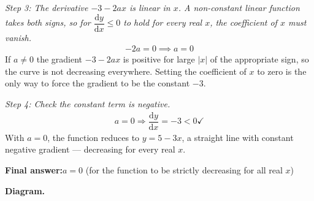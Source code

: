 \documentclass[11pt]{article}
\begin{document}
\textit{Step 3: The derivative \( -3 - 2ax \) is linear in \( x \). A non-constant linear function takes both signs, so for \( \dfrac{\mathrm{d}y}{\mathrm{d}x} \leq 0 \) to hold for every real \( x \), the coefficient of \( x \) must vanish.}
\[\begin{gathered}
-2a = 0 \implies a = 0
\end{gathered}\]
If \( a \neq 0 \) the gradient \( -3 - 2ax \) is positive for large \( |x| \) of the appropriate sign, so the curve is not decreasing everywhere. Setting the coefficient of \( x \) to zero is the only way to force the gradient to be the constant \(-3\).

\textit{Step 4: Check the constant term is negative.}
\[\begin{gathered}
a = 0 \Rightarrow \dfrac{\mathrm{d}y}{\mathrm{d}x} = -3 < 0 \checkmark
\end{gathered}\]
With \( a = 0 \), the function reduces to \( y = 5 - 3x \), a straight line with constant negative gradient --- decreasing for every real \( x \).

\begin{answerbox}
\textbf{Final answer:}\quad \(\displaystyle  a = 0 \) (for the function to be strictly decreasing for all real \(\displaystyle  x \))
\end{answerbox}
\textbf{Diagram.}
\end{document}
